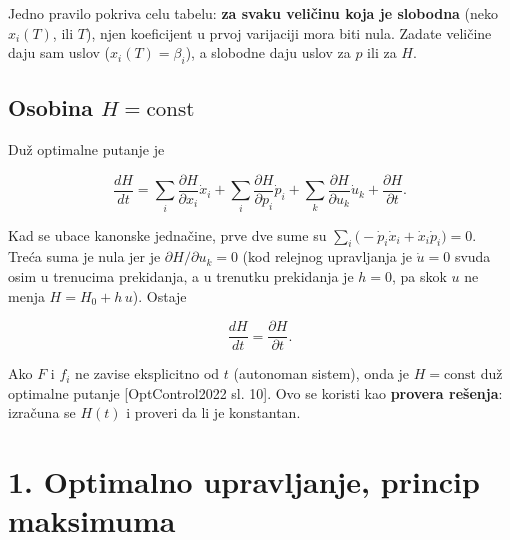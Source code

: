 \documentclass[11pt,a4paper,parskip=half,headsepline,numbers=noenddot]{scrartcl}
\DeclareRobustCommand{\izvor}[1]{{\small\color{izvorC}[#1]}}
\begin{document}
\begin{kljucna}
Jedno pravilo pokriva celu tabelu: \textbf{za svaku veličinu koja je slobodna} (neko \(x_i(T)\), ili \(T\)), njen koeficijent u prvoj varijaciji mora biti nula. Zadate veličine daju sam uslov (\(x_i(T) = \beta_i\)), a slobodne daju uslov za \(p\) ili za \(H\).
\end{kljucna}

\subsection{\texorpdfstring{Osobina \(H = \text{const}\)}{Osobina H = \textbackslash text\{const\}}}

Duž optimalne putanje je

\[\frac{dH}{dt} = \sum_i \frac{\partial H}{\partial x_i}\dot x_i + \sum_i \frac{\partial H}{\partial p_i}\dot p_i + \sum_k \frac{\partial H}{\partial u_k}\dot u_k + \frac{\partial H}{\partial t} .\]

Kad se ubace kanonske jednačine, prve dve sume su \(\sum_i \big(-\dot p_i \dot x_i + \dot x_i \dot p_i\big) = 0\). Treća suma je nula jer je \(\partial H/\partial u_k = 0\) (kod relejnog upravljanja je \(\dot u = 0\) svuda osim u trenucima prekidanja, a u trenutku prekidanja je \(h = 0\), pa skok \(u\) ne menja \(H = H_0 + h\,u\)). Ostaje

\[\frac{dH}{dt} = \frac{\partial H}{\partial t} .\]

Ako \(F\) i \(f_i\) ne zavise eksplicitno od \(t\) (autonoman sistem), onda je \textbf{\(H = \text{const}\)} duž optimalne putanje \izvor{OptControl2022 sl. 10}. Ovo se koristi kao \textbf{provera rešenja}: izračuna se \(H(t)\) i proveri da li je konstantan.

\section{1. Optimalno upravljanje, princip maksimuma}
\end{document}
